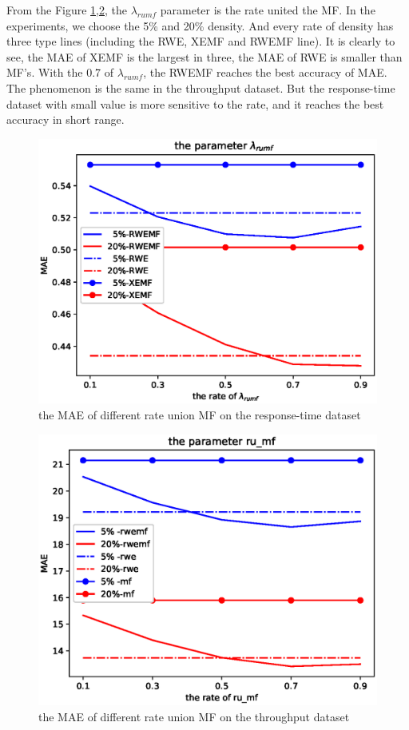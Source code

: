 \documentclass[conference]{IEEEtran}
\begin{document}
\par From the Figure \ref{fig_rumf_rt},\ref{fig_rumf_tp}, the $\lambda_{rumf}$ parameter is the rate united the MF. In the experiments, we choose the 5\% and 20\% density. And every rate of density has three type lines (including the RWE, XEMF and RWEMF line). It is clearly to see, the MAE of XEMF is the largest in three, the MAE of RWE is smaller than MF's. With the 0.7 of $\lambda_{rumf}$, the RWEMF reaches the best accuracy of MAE. The phenomenon is the same in the throughput dataset. But the response-time dataset with small value is more sensitive to the rate, and it reaches the best accuracy in short range. 


\begin{figure}[H] 
\centering  
\includegraphics[width=0.45\paperwidth]{rumf_rt.eps}  
\caption{the MAE of different rate union MF on the response-time dataset }  
\label{fig_rumf_rt}  
\end{figure} 

\begin{figure}[H] 
\centering  
\includegraphics[width=0.45\paperwidth]{rumf_tp.eps}  
\caption{the MAE of different rate union MF  on the throughput dataset }
\label{fig_rumf_tp}  
\end{figure} 
\end{document}
